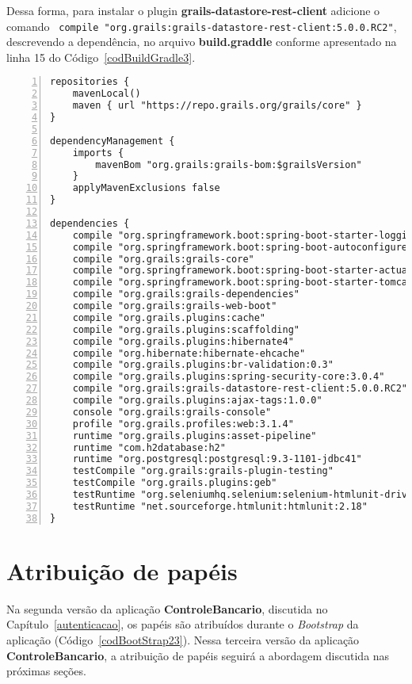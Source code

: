 Dessa forma, para instalar  o plugin {\bf grails-datastore-rest-client} adicione
o comando \texttt{ compile "org.grails:grails-datastore-rest-client:5.0.0.RC2"},
descrevendo a  dependência, no arquivo {\bf  build.graddle} conforme apresentado
na linha 15 do Código~\ref{codBuildGradle3}. 

\begin{lstlisting}[numbers=left,  caption={\bf  build.gradle}, frame=trBL,
    float=htbp, label=codBuildGradle3, basicstyle =\footnotesize]
repositories {
    mavenLocal()
    maven { url "https://repo.grails.org/grails/core" }
}

dependencyManagement {
    imports {
        mavenBom "org.grails:grails-bom:$grailsVersion"
    }
    applyMavenExclusions false
}

dependencies {
    compile "org.springframework.boot:spring-boot-starter-logging"
    compile "org.springframework.boot:spring-boot-autoconfigure"
    compile "org.grails:grails-core"
    compile "org.springframework.boot:spring-boot-starter-actuator"
    compile "org.springframework.boot:spring-boot-starter-tomcat"
    compile "org.grails:grails-dependencies"
    compile "org.grails:grails-web-boot"
    compile "org.grails.plugins:cache"
    compile "org.grails.plugins:scaffolding"
    compile "org.grails.plugins:hibernate4"
    compile "org.hibernate:hibernate-ehcache"
    compile "org.grails.plugins:br-validation:0.3"
    compile "org.grails.plugins:spring-security-core:3.0.4"
    compile "org.grails:grails-datastore-rest-client:5.0.0.RC2"
    compile "org.grails.plugins:ajax-tags:1.0.0"
    console "org.grails:grails-console"
    profile "org.grails.profiles:web:3.1.4"
    runtime "org.grails.plugins:asset-pipeline"
    runtime "com.h2database:h2"
    runtime "org.postgresql:postgresql:9.3-1101-jdbc41"
    testCompile "org.grails:grails-plugin-testing"
    testCompile "org.grails.plugins:geb"
    testRuntime "org.seleniumhq.selenium:selenium-htmlunit-driver:2.47.1"
    testRuntime "net.sourceforge.htmlunit:htmlunit:2.18"
}
\end{lstlisting}

\section{Atribuição de papéis}

\vspace{0.5cm}

Na   segunda  versão   da   aplicação  {\bf   ControleBancario},  discutida   no
Capítulo~\ref{autenticacao}, os papéis são  atribuídos durante o {\it Bootstrap}
da aplicação  (Código~\ref{codBootStrap23}). Nessa terceira  versão da aplicação
{\bf ControleBancario}, a atribuição de papéis seguirá a abordagem discutida nas
próximas seções. 

